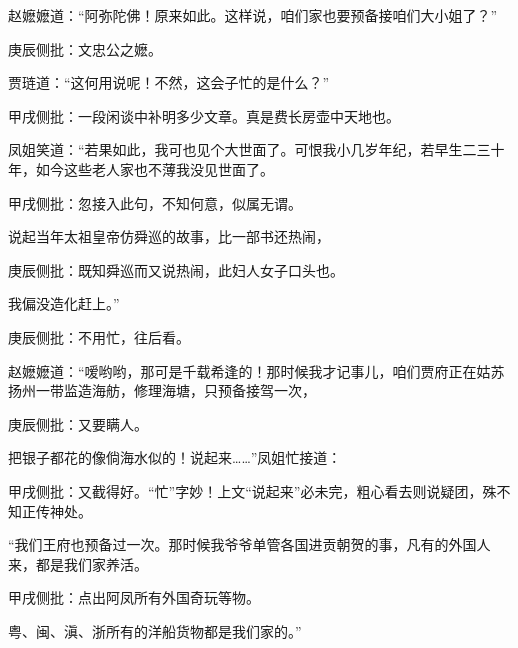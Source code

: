 \begin{parag}


    赵嬷嬷道：“阿弥陀佛！原来如此。这样说，咱们家也要预备接咱们大小姐了？”\begin{note}庚辰侧批：文忠公之嬷。\end{note}贾琏道：“这何用说呢！不然，这会子忙的是什么？”\begin{note}甲戌侧批：一段闲谈中补明多少文章。真是费长房壶中天地也。\end{note}凤姐笑道：“若果如此，我可也见个大世面了。可恨我小几岁年纪，若早生二三十年，如今这些老人家也不薄我没见世面了。\begin{note}甲戌侧批：忽接入此句，不知何意，似属无谓。\end{note}说起当年太祖皇帝仿舜巡的故事，比一部书还热闹，\begin{note}庚辰侧批：既知舜巡而又说热闹，此妇人女子口头也。\end{note}我偏没造化赶上。”\begin{note}庚辰侧批：不用忙，往后看。\end{note}赵嬷嬷道：“嗳哟哟，那可是千载希逢的！那时候我才记事儿，咱们贾府正在姑苏扬州一带监造海舫，修理海塘，只预备接驾一次，\begin{note}庚辰侧批：又要瞒人。\end{note}把银子都花的像倘海水似的！说起来……”凤姐忙接道：\begin{note}甲戌侧批：又截得好。“忙”字妙！上文“说起来”必未完，粗心看去则说疑团，殊不知正传神处。\end{note}“我们王府也预备过一次。那时候我爷爷单管各国进贡朝贺的事，凡有的外国人来，都是我们家养活。\begin{note}甲戌侧批：点出阿凤所有外国奇玩等物。\end{note}粤、闽、滇、浙所有的洋船货物都是我们家的。”
\end{parag}


